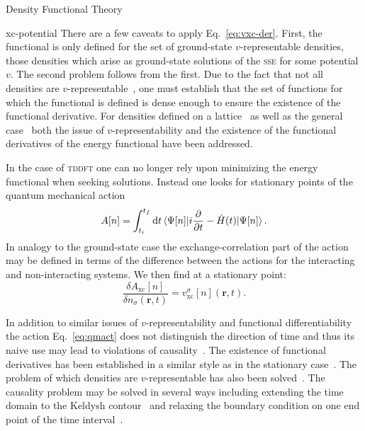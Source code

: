 \documentclass[letterpaper, 11 pt]{report}
\begin{document}
\begin{chapter}{Density Functional Theory \label{chap:dft}}
\begin{section}{xc-potential \label{sec:xcpot}}
      There are a few caveats to apply Eq.~\eqref{eq:vxc-der}. First, the functional is only defined
      for the set of ground-state $v$-representable densities, those densities which arise as
      ground-state solutions of the \textsc{sse} for some potential $v$. The second problem follows
      from the first. Due to the fact that not all densities are $v$-representable~\cite{not-vrep1,
      not-vrep2, not-vrep3}, one must establish that the set of functions for which the functional is
      defined is dense enough to ensure the existence of the functional derivative. For densities
      defined on a lattice~\cite{vrep-lat} as well as the general case~\cite{nonint1, nonint2,
      vrep-levy1, not-vrep1, vrep-lieb, vrep-rev} both the issue of $v$-representability and the
      existence of the functional derivatives of the energy functional have been addressed.

      In the case of \textsc{tddft} one can no longer rely upon minimizing the energy functional when
      seeking solutions. Instead one looks for stationary points of the quantum mechanical
      action~\cite{qmaction}
      \begin{equation} \label{eq:qmact}
         A[n] = \int^{t_f}_{t_i} \mathrm{d}t
            \braket{\Psi[n] |i\frac{\partial}{\partial t} -\hat{H}(t) | \Psi[n]}.
      \end{equation}
      In analogy to the ground-state case the exchange-correlation part of the action may be defined in
      terms of the difference between the actions for the interacting and non-interacting systems. We
      then find at a stationary point:
      \begin{equation} \label{eq:tdvxc-der}
         \frac{\delta A_\mathrm{xc}[n]}{\delta n_\sigma(\mathbf{r},t)}
            = v^\sigma_\mathrm{xc}[n](\mathbf{r},t).
      \end{equation}

      In addition to similar issues of $v$-representability and functional differentiability the action
      Eq.~\eqref{eq:qmact} does not distinguish the direction of time and thus its naive use may lead
      to violations of causality~\cite{tddft-causality}. The existence of functional derivatives has
      been established in a similar style as in the stationary case~\cite{td-welldef}. The problem of
      which densities are $v$-representable has also been solved~\cite{td-vrep}. The causality problem
      may be solved in several ways including extending the time domain to the Keldysh
      contour~\cite{caus-sol1} and relaxing the boundary condition on one end point of the time
      interval~\cite{caus-sol2}.


\end{section}
\end{chapter}
\end{document}
